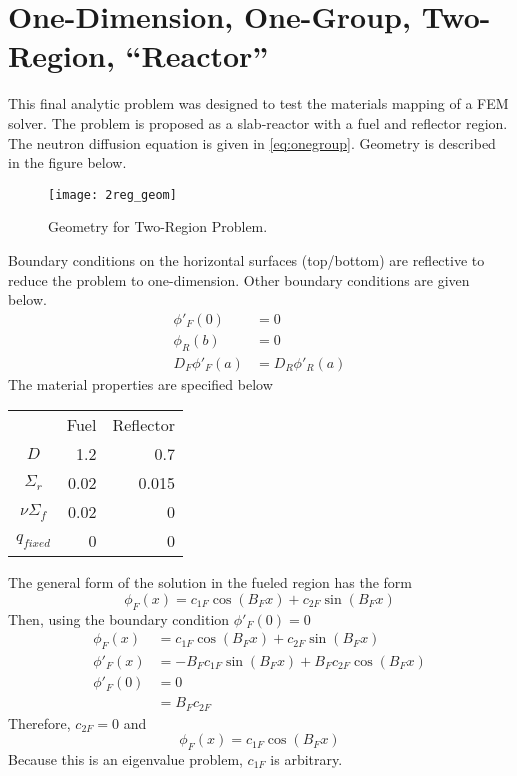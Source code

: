 \documentclass{article}
\begin{document}
\section{One-Dimension, One-Group, Two-Region, ``Reactor''}
  This final analytic problem was designed to test the materials mapping of a
  FEM solver. The problem is proposed as a slab-reactor with a fuel and 
  reflector region. The neutron diffusion equation is given in 
  \eqref{eq:onegroup}. Geometry is described in the figure below.
  \begin{figure}[H] 
    \centering
    \texttt{[image: 2reg\_geom]}
    \caption{Geometry for Two-Region Problem.}
    \label{fg:2reg_geom}
  \end{figure}
  Boundary conditions on the horizontal surfaces (top/bottom) are reflective
  to reduce the problem to one-dimension. Other boundary conditions are given
  below.
  \begin{align}
    \phi'_F(0)&=0\\
    \phi_R(b)&=0\\
    D_F\phi'_F(a)&=D_R\phi'_R(a)
  \end{align}
  The material properties are specified below
  \begin{center}
  \begin{tabular}{c r r}
    & Fuel & Reflector\\
    $D$ & 1.2 & 0.7 \\
    $\Sigma_r$ & 0.02 & 0.015 \\
    $\nu \Sigma_f$ & 0.02 & 0 \\
    $q_{fixed}$ & 0 & 0
  \end{tabular}
  \end{center}
  The general form of the solution in the fueled region has the form 
  \[ \phi_F(x) = c_{1F} \cos(B_F x) + c_{2F} \sin(B_F x) \]
  Then, using the boundary condition $\phi'_F(0)=0$
  \begin{align}
    \phi_F(x) &= c_{1F} \cos(B_F x) + c_{2F} \sin(B_F x) \\
    \phi'_F(x) &= -B_F c_{1F} \sin(B_F x) + B_F c_{2F} \cos(B_F x) \\
    \phi'_F(0) &= 0\\
    &=B_F c_{2F}
  \end{align}
  Therefore, $c_{2F}=0$ and
  \begin{equation}
    \phi_F(x) = c_{1F} \cos(B_F x)
  \end{equation}
  Because this is an eigenvalue problem, $c_{1F}$ is arbitrary.
  
\end{document}
